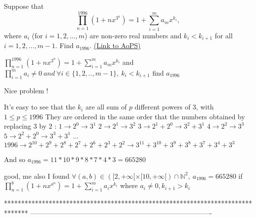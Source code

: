 \begin{problem}
	Suppose that
\[\prod_{n=1}^{1996}(1+nx^{3^{n}})=1+\sum_{i=1}^{m}a_{m}x^{k_{i}},\]
where $a_i$ (for $i=1,2,\ldots,m$) are non-zero real numbers and $k_{i}<k_{i+1}$ for all $i=1,2,\ldots,m-1$. Find $a_{1996}$.
	\flushright \href{https://artofproblemsolving.com/community/c6h152574}{(Link to AoPS)}
\end{problem}



\begin{solution}
	\begin{tcolorbox}$\prod_{n=1}^{1996}(1+nx^{3^{n}})=1+\sum_{i=1}^{m}a_{m}x^{k_{i}}$
and $\prod_{i=1}^{m}a_{i}\neq 0\ and\ \forall i\in\{1,2,..,m-1\},\ k_{i}<k_{i+1}$
find $a_{1996}$\end{tcolorbox}

Nice problem !

It's easy to see that the $k_{i}$ are all sum of $p$ different powers of $3$, with $1\leq p \leq 1996$
They are ordered in the same order that the numbers obtained by replacing $3$ by $2$ :
$1\rightarrow 2^{0}\rightarrow 3^{1}$
$2\rightarrow 2^{1}\rightarrow 3^{2}$
$3\rightarrow 2^{1}+2^{0}\rightarrow 3^{2}+3^{1}$
$4\rightarrow 2^{2}\rightarrow 3^{3}$
$5\rightarrow 2^{2}+2^{0}\rightarrow 3^{3}+3^{1}$
...
$1996\rightarrow 2^{10}+2^{9}+2^{8}+2^{7}+2^{6}+2^{3}+2^{2}\rightarrow 3^{11}+3^{10}+3^{9}+3^{8}+3^{7}+3^{4}+3^{3}$

And so $a_{1996}=11*10*9*8*7*4*3=665280$
\end{solution}



\begin{solution}
	good,
me also I found $\forall (a,b)\in ([2,+\infty[\times [10,+\infty[)\cap \mathbb{N}^{2},\ a_{1996}=665280$
if $\prod_{n=1}^{b}(1+nx^{a^{n}})=1+\sum_{i=1}^{m}a_{i}x^{k_{i}}$ where $a_{i}\neq 0,k_{i+1}>k_{i}$
\end{solution}
*******************************************************************************
-------------------------------------------------------------------------------

